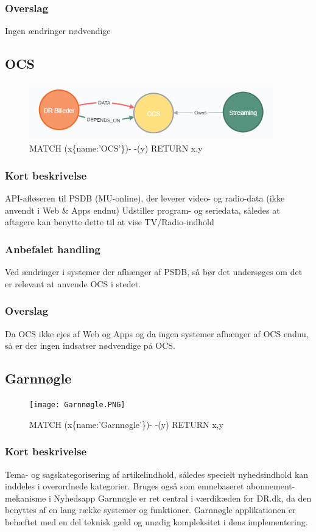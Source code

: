 \documentclass{article}
\begin{document}
\subsubsection{Overslag}
Ingen ændringer nødvendige


\subsection{OCS}
\begin{figure}[h]
\includegraphics[width=300pt]{OCS.PNG}
\caption{MATCH (x\{name:'OCS'\})- -(y) RETURN x,y}
\end{figure}
\subsubsection{Kort beskrivelse}
API-afløseren til PSDB (MU-online), der leverer video- og radio-data (ikke anvendt i Web \& Apps endnu)	Udstiller program- og seriedata, således at aftagere kan benytte dette til at vise TV/Radio-indhold
\subsubsection{Anbefalet handling}
Ved ændringer i systemer der afhænger af PSDB, så bør det undersøges om det er relevant at anvende OCS i stedet.
\subsubsection{Overslag}
Da OCS ikke ejes af Web og Apps og da ingen systemer afhænger af OCS endnu, så er der ingen indsatser nødvendige på OCS.


\subsection{Garnnøgle}
\begin{figure}[h]
\texttt{[image: Garnnøgle.PNG]}
\caption{MATCH (x\{name:'Garnnøgle'\})- -(y) RETURN x,y}
\end{figure}
\subsubsection{Kort beskrivelse}
Tema- og sagskategorisering af artikelindhold, således specielt nyhedsindhold kan inddeles i overordnede kategorier. Bruges også som emnebaseret abonnement-mekanisme i Nyhedsapp
Garnnøgle er ret central i værdikæden for DR.dk, da den benyttes af en lang række systemer og funktioner. Garnnøgle applikationen er behæftet med en del teknisk gæld og unødig kompleksitet i dens implementering.
\end{document}
